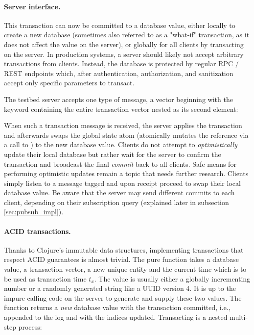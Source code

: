 \paragraph{Server interface.}
This transaction can now be committed to a database value, either locally to create a new database (sometimes also referred to as a "what-if" transaction, as it does not affect the value on the server), or globally for all clients by transacting on the server. In production systems, a server should likely not accept arbitrary transactions from clients. Instead, the database is protected by regular \gls{RPC} / REST endpoints which, after authentication, authorization, and sanitization accept only specific parameters to transact.

The testbed server accepts one type of message, a vector beginning with the keyword  containing the entire transaction vector nested as its second element:

\begin{center}
\end{center}

When such a transaction message is received, the server applies the transaction and afterwards swaps the global state atom (atomically mutates the reference via a call to ) to the new database value. Clients do not attempt to \emph{optimistically} update their local database but rather wait for the server to confirm the transaction and broadcast the final \emph{commit} back to all clients. Safe means for performing optimistic updates remain a topic that needs further research. Clients simply listen to a message tagged  and upon receipt proceed to swap their local database value. Be aware that the server may send different commits to each client, depending on their subscription query (explained later in subsection \ref{sec:pubsub_impl}).

\paragraph{ACID transactions.}
Thanks to Clojure's immutable data structures, implementing transactions that respect \gls{ACID} guarantees is almost trivial.
The pure function  takes a database value, a transaction vector, a new unique entity  and the current time which is to be used as transaction time $t_x$. The  value is usually either a globally incrementing number or a randomly generated string like a \gls{UUID} version 4. It is up to the impure calling code on the server to generate and supply these two values. The  function returns a \emph{new} database value with the transaction committed, i.e., appended to the log and with the indices updated. Transacting is a nested multi-step process:

